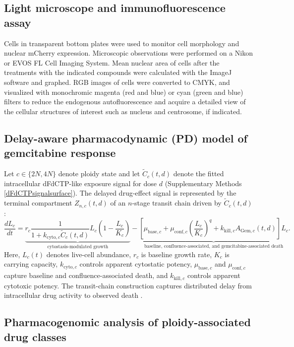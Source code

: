\documentclass[11pt,notitlepage]{article}
\begin{document}
\subsection{Light microscope and immunofluorescence assay}
Cells in transparent bottom plates were used to monitor cell morphology and nuclear mCherry expression. Microscopic observations were performed on a Nikon or EVOS FL Cell Imaging System. Mean nuclear area of cells after the treatments with the indicated compounds were calculated with the ImageJ software and graphed. RGB images of cells were converted to CMYK, and visualized with monochromic magenta (red and blue) or cyan (green and blue) filters to reduce the endogenous autofluorescence and acquire a detailed view of the cellular structures of interest such as nucleus and centrosome, if indicated.


\subsection{Delay-aware pharmacodynamic (PD) model of gemcitabine response}
Let \(c\in\{2N,4N\}\) denote ploidy state and let \(\widetilde{C}_c(t,d)\) denote the fitted intracellular dFdCTP-like exposure signal for dose \(d\) (Supplementary Methods \ref{dFdCTPsignalsurface}). The delayed drug-effect signal is represented by the terminal compartment \(Z_{n,c}(t,d)\) of an \(n\)-stage transit chain driven by \(\widetilde{C}_c(t,d)\):
\begin{equation}
\label{eq:gem_prelim_activity_model}
\frac{dL_c}{dt}
=
\underbrace{
r_c
\frac{1}{1+k_{\mathrm{cyto},c}\widetilde{C}_c(t,d)}
L_c\left(1-\frac{L_c}{K_c}\right)
}_{\text{cytostasis-modulated growth}}
-
\underbrace{
\left[
\mu_{\mathrm{base},c}
+
\mu_{\mathrm{conf},c}\left(\frac{L_c}{K_c}\right)^q
+
k_{\mathrm{kill},c}A_{\mathrm{Gem},c}(t,d)
\right]L_c
}_{\text{baseline, confluence-associated, and gemcitabine-associated death}} .
\end{equation}
Here, \(L_c(t)\) denotes live-cell abundance, \(r_c\) is baseline growth rate, \(K_c\) is carrying capacity, \(k_{\mathrm{cyto},c}\) controls apparent cytostatic potency, \(\mu_{\mathrm{base},c}\) and \(\mu_{\mathrm{conf},c}\) capture baseline and confluence-associated death, and \(k_{\mathrm{kill},c}\) controls apparent cytotoxic potency. The transit-chain construction captures distributed delay from intracellular drug activity to observed death \cite{gross_analysis_2023,hurtado_building_2021}.


  
\subsection{Pharmacogenomic analysis of ploidy-associated drug classes} \label{sec:methods-gdsc-drug-classes}
\end{document}
